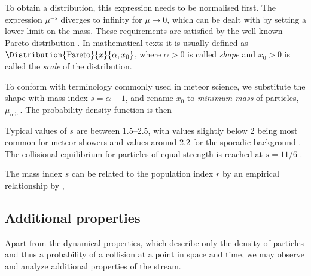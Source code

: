             To obtain a distribution, this expression needs to be normalised first.
            The expression $\mu^{-s}$ diverges to infinity for $\mu \to 0$,
            which can be dealt with by setting a lower limit on the mass.
            These requirements are satisfied by the well-known Pareto distribution \citep{arnold1983}.
            In mathematical texts it is usually defined as $\Distribution{\mathrm{Pareto}}{x}{\alpha, x_0}$,
            where $\alpha > 0$ is called \emph{shape} and $x_0 > 0$ is called the \emph{scale} of the distribution.

            To conform with terminology commonly used in meteor science, we substitute the shape with mass index
            $s = \alpha - 1$, and rename $x_0$ to \emph{minimum mass} of particles, $\mu_\mathrm{min}$.
            The probability density function is then

            Typical values of $s$ are between \numrange{1.5}{2.5}, with values slightly below 2 being most common
            for meteor showers and values around \num{2.2} for the sporadic background \citep{blaauw+2011}.
            The collisional equilibrium for particles of equal strength is reached at $s = 11/6$ \citep{dohnanyi1969}.

            The mass index $s$ can be related to the population index $r$ by an empirical relationship by \citet{koschack+1990},

    \subsection{Additional properties} \label{moa}
        Apart from the dynamical properties, which describe only the density of particles
        and thus a probability of a collision at a point in space and time,
        we may observe and analyze additional properties of the stream.


